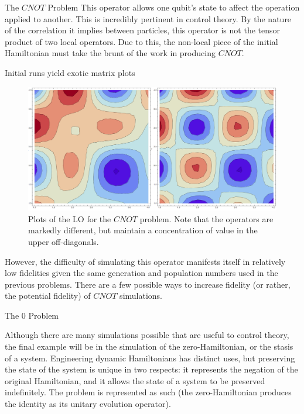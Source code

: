 \documentclass[12pt]{beamer}
\begin{document}
\begin{frame}
\begin{columns}
\begin{column}{.45\textwidth}
\begin{exampleblock}{The $CNOT$ Problem}
	This operator allows one qubit's state to affect the operation applied to another. This is incredibly pertinent in control theory. By the nature of the correlation it implies between particles, this operator is not the tensor product of two local operators. Due to this, the non-local piece of the initial Hamiltonian must take the brunt of the work in producing $CNOT$. 

	Initial runs yield exotic matrix plots 
	
	\begin{figure}[htpb]
		\centering
			\includegraphics[scale=0.4]{cnot_matrices.png}
		\centering
		\caption{Plots of the LO for the $CNOT$ problem. Note that the operators are markedly different, but maintain a concentration of value in the upper off-diagonals.}
		\label{fig:cnot_matrix}
	\end{figure}

	However, the difficulty of simulating this operator manifests itself in relatively low fidelities given the same generation and population numbers used in the previous problems. There are a few possible ways to increase fidelity (or rather, the potential fidelity) of $CNOT$ simulations.
     \end{exampleblock}
     \vspace{1em}

			\begin{block}{The 0 Problem}

	Although there are many simulations possible that are useful to control theory, the final example will be in the simulation of the zero-Hamiltonian, or the stasis of a system. Engineering dynamic Hamiltonians has distinct uses, but preserving the state of the system is unique in two respects: it represents the negation of the original Hamiltonian, and it allows the state of a system to be preserved indefinitely. The problem is represented as such (the zero-Hamiltonian produces the identity as its unitary evolution operator). 


\end{block}
\end{column}
\end{columns}
\end{frame}
\end{document}
